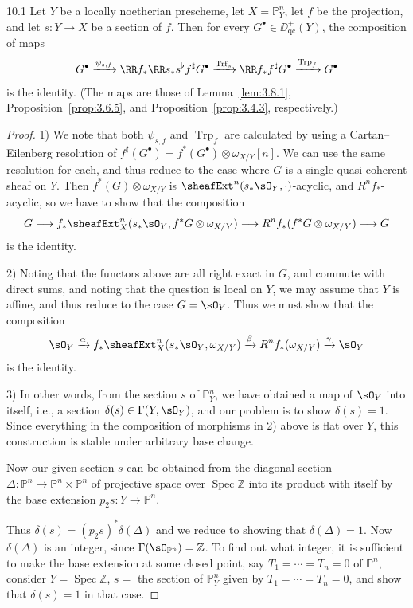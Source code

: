 \begin{bookproposition}{10.1}\label{prop:3.10.1}
Let $Y$ be a locally noetherian prescheme, let $X=\mathbb{P}^n_Y$, let $f$ be the projection, and let $s\colon Y\to X$ be a section of $f$. Then for every $G^\bullet\in\DD_{\mathrm{qc}}^+(Y)$, the composition of maps
\[
G^\bullet \xrightarrow{\psi_{s,f}} \RR f_* \RR s_* s^{\flat} f^{\sharp} G^\bullet \xrightarrow{\operatorname{Trf}_s} \RR f_* f^{\sharp} G^\bullet \xrightarrow{\operatorname{Trp}_f} G^\bullet
\]
is the identity. (The maps are those of Lemma~\ref{lem:3.8.1}, Proposition~\ref{prop:3.6.5}, and Proposition~\ref{prop:3.4.3}, respectively.)
\end{bookproposition}

\begin{proof}
1) We note that both $\psi_{s,f}$ and $\operatorname{Trp}_f$ are calculated by using a Cartan--Eilenberg resolution of $f^{\sharp}(G^\bullet)=f^*(G^\bullet)\otimes\omega_{X/Y}[n]$. We can use the same resolution for each, and thus reduce to the case where $G$ is a single quasi-coherent sheaf on $Y$. Then $f^*(G)\otimes\omega_{X/Y}$ is $\sheafExt^n(s_*\sO_Y,\cdot)$-acyclic, and $R^n f_*$-acyclic, so we have to show that the composition
\[
G \longrightarrow f_* \sheafExt^n_X(s_*\sO_Y, f^*G\otimes\omega_{X/Y}) \longrightarrow R^n f_*(f^*G\otimes\omega_{X/Y}) \longrightarrow G
\]
is the identity.

2) Noting that the functors above are all right exact in $G$, and commute with direct sums, and noting that the question is local on $Y$, we may assume that $Y$ is affine, and thus reduce to the case $G=\sO_Y$. Thus we must show that the composition
\[
\sO_Y \xrightarrow{\alpha} f_* \sheafExt^n_X(s_*\sO_Y, \omega_{X/Y}) \xrightarrow{\beta} R^n f_*(\omega_{X/Y}) \xrightarrow{\gamma} \sO_Y
\]
is the identity.

3) In other words, from the section $s$ of $\mathbb{P}^n_Y$, we have obtained a map of $\sO_Y$ into itself, i.e., a section $\delta(s)\in\Gamma(Y,\sO_Y)$, and our problem is to show $\delta(s)=1$. Since everything in the composition of morphisms in 2) above is flat over $Y$, this construction is stable under arbitrary base change.

Now our given section $s$ can be obtained from the diagonal section $\Delta\colon \mathbb{P}^n\to\mathbb{P}^n\times\mathbb{P}^n$ of projective space over $\operatorname{Spec}\mathbb{Z}$ into its product with itself by the base extension $p_2 s\colon Y\to\mathbb{P}^n$.

Thus $\delta(s)=(p_2 s)^*\delta(\Delta)$ and we reduce to showing that $\delta(\Delta)=1$. Now $\delta(\Delta)$ is an integer, since $\Gamma(\sO_{\mathbb{P}^n})=\mathbb{Z}$. To find out what integer, it is sufficient to make the base extension at some closed point, say $T_1=\cdots=T_n=0$ of $\mathbb{P}^n$, consider $Y=\operatorname{Spec}\mathbb{Z}$, $s=$ the section of $\mathbb{P}^n_Y$ given by $T_1=\cdots=T_n=0$, and show that $\delta(s)=1$ in that case.


\end{proof}
